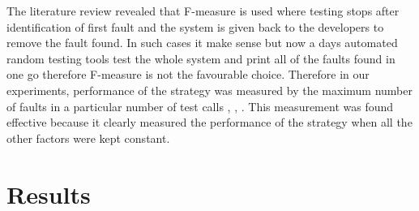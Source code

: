 \documentclass[conference]{IEEEtran}
\begin{document}



  
The literature review revealed that F-measure is used where testing stops after identification of first fault and the system is given back to the developers to remove the fault found. In such cases it make sense but now a days automated random testing tools test the whole system and print all of the faults found in one go therefore F-measure is not the favourable choice. Therefore in our experiments, performance of the strategy was measured by the maximum number of faults in a particular number of test calls \cite{Pacheco2007a}, \cite{Ciupa2007}, \cite{Ciupa2008b}. This measurement was found effective because it clearly measured the performance of the strategy when all the other factors were kept constant.


\section{Results}\label{sec:res}
\end{document}

